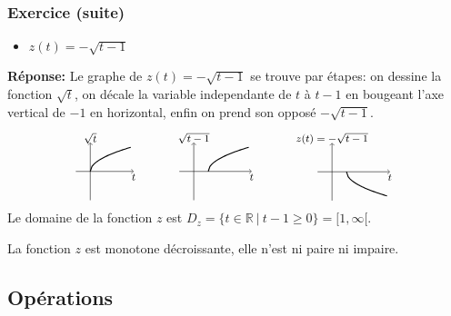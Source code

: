 \documentclass[10pt]{beamer}
\newcommand{\bitem}{\item[$\bullet$]}
\newcommand{\R}{\mathbb R}
\begin{document}
\begin{frame}[plain]
\frametitle{\bf Exercice (suite)}
\medskip 

\begin{itemize}
\bitem
$z(t)=-\sqrt{t-1}$
\end{itemize}
\vspace*{2mm}

\pause
{\bf R\'eponse:}
Le graphe de $z(t)= -\sqrt{t-1}$ se trouve par \'etapes: 
on dessine la fonction $\sqrt{t}$, on d\'ecale la variable independante 
de $t$ \`a $t-1$ en bougeant l'axe vertical de $-1$ en horizontal, 
enfin on prend son oppos\'e $-\sqrt{t-1}$.
$$
\raisebox{-\height}{\exoSQRTA} \qquad
\raisebox{-\height}{\exoSQRTB} \qquad
\raisebox{-\height}{\exoSQRTC} 
$$
\pause
Le domaine de la fonction $z$ est\quad 
$D_z=\{ t\in\R\ |\ t-1\geq 0 \} = [1,\infty[$. 
\vspace*{1mm}

\parbox{10cm}{
La fonction $z$ est monotone d\'ecroissante, elle n'est ni paire ni impaire.}

\end{frame}


\subsection{Op\'erations} 
\end{document}
